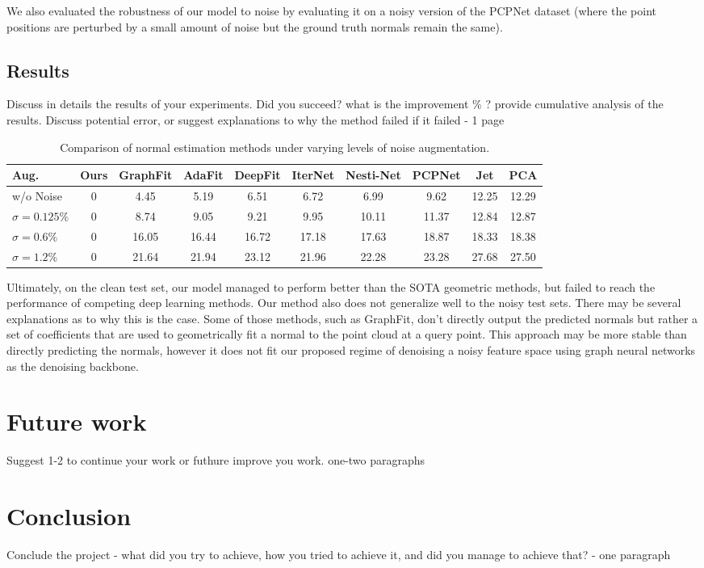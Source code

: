 \documentclass{acmart}
\begin{document}
We also evaluated the robustness of our model to noise by evaluating it on a noisy version of the PCPNet dataset (where the point positions are perturbed by a small amount of noise but the ground truth normals remain the same).
 \subsection{Results}
 Discuss in details the results of your experiments. Did you succeed? what is the improvement \% ? provide cumulative analysis of the results. Discuss potential error, or suggest explanations to why the method failed if it failed - 
 1 page

 \begin{table}[ht]
  \centering
  \caption{Comparison of normal estimation methods under varying levels of noise augmentation.}
  \label{tab:noise_comparison}
  \begin{tabular}{lccccccccc}
  \hline
  \textbf{Aug.} & \textbf{Ours} & \textbf{GraphFit} & \textbf{AdaFit} & \textbf{DeepFit} & \textbf{IterNet} & \textbf{Nesti-Net} & \textbf{PCPNet} & \textbf{Jet} & \textbf{PCA} \\ \hline
  w/o Noise & 0 & 4.45  & 5.19  & 6.51  & 6.72  & 6.99  & 9.62  & 12.25 & 12.29 \\
  $\sigma = 0.125\%$ & 0 & 8.74  & 9.05  & 9.21  & 9.95  & 10.11 & 11.37 & 12.84 & 12.87 \\
  $\sigma = 0.6\%$  & 0 & 16.05 & 16.44 & 16.72 & 17.18 & 17.63 & 18.87 & 18.33 & 18.38 \\
  $\sigma = 1.2\%$  & 0 & 21.64 & 21.94 & 23.12 & 21.96 & 22.28 & 23.28 & 27.68 & 27.50 \\ \hline
  \end{tabular}
  \end{table}

Ultimately, on the clean test set, our model managed to perform better than the SOTA geometric methods, but failed to reach the performance of competing deep learning methods. Our method also does not generalize well to the noisy test sets. There may be several explanations as to why this is the case. Some of those methods, such as GraphFit, don't directly output the predicted normals but rather a set of coefficients that are used to geometrically fit a normal to the point cloud at a query point. This approach may be more stable than directly predicting the normals, however it does not fit our proposed regime of denoising a noisy feature space using graph neural networks as the denoising backbone.


\section{Future work}
Suggest 1-2 to continue your work or futhure improve you work.
one-two paragraphs

\section{Conclusion}
Conclude the project - what did you try to achieve, how you tried to achieve it, and did you manage to achieve that?  - one paragraph



\end{document}
